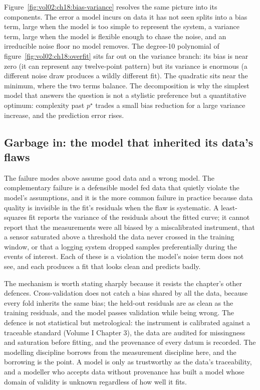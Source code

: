 

Figure~\ref{fig:vol02:ch18:bias-variance} resolves the same picture into
its components. The error a model incurs on data it has not seen splits
into a bias term, large when the model is too simple to represent the
system, a variance term, large when the model is flexible enough to chase
the noise, and an irreducible noise floor no model removes. The
degree-10 polynomial of figure~\ref{fig:vol02:ch18:overfit} sits far out
on the variance branch: its bias is near zero (it can represent any
twelve-point pattern) but its variance is enormous (a different noise
draw produces a wildly different fit). The quadratic sits near the
minimum, where the two terms balance. The decomposition is why the
simplest model that answers the question is not a stylistic preference
but a quantitative optimum: complexity past $p^\star$ trades a small bias
reduction for a large variance increase, and the prediction error rises.

\subsection{Garbage in: the model that inherited its data's flaws}

The failure modes above assume good data and a wrong model. The
complementary failure is a defensible model fed data that quietly
violate the model's assumptions, and it is the more common failure in
practice because data quality is invisible in the fit's residuals when
the flaw is systematic. A least-squares fit reports the variance of the
residuals about the fitted curve; it cannot report that the
measurements were all biased by a miscalibrated instrument, that a
sensor saturated above a threshold the data never crossed in the
training window, or that a logging system dropped samples
preferentially during the events of interest. Each of these is a
violation the model's noise term does not see, and each produces a fit
that looks clean and predicts badly.

The mechanism is worth stating sharply because it resists the chapter's
other defences. Cross-validation does not catch a bias shared by all the
data, because every fold inherits the same bias; the held-out residuals
are as clean as the training residuals, and the model passes validation
while being wrong. The defence is not statistical but metrological: the
instrument is calibrated against a traceable standard (Volume I Chapter
3), the data are audited for missingness and saturation before fitting,
and the provenance of every datum is recorded. The modelling discipline
borrows from the measurement discipline here, and the borrowing is the
point. A model is only as trustworthy as the data's traceability, and a
modeller who accepts data without provenance has built a model whose
domain of validity is unknown regardless of how well it fits.

